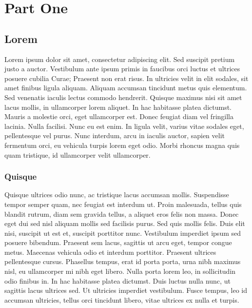 \part{Part One}

\chapter{Lorem}

\setcounter{page}{1}

Lorem ipsum dolor sit amet, consectetur adipiscing elit. Sed suscipit pretium justo a auctor. Vestibulum ante ipsum primis in faucibus orci luctus et ultrices posuere cubilia Curae; Praesent non erat risus. In ultricies velit in elit sodales, sit amet finibus ligula aliquam. Aliquam accumsan tincidunt metus quis elementum. Sed venenatis iaculis lectus commodo hendrerit. Quisque maximus nisi sit amet lacus mollis, in ullamcorper lorem aliquet. In hac habitasse platea dictumst. Mauris a molestie orci, eget ullamcorper est. Donec feugiat diam vel fringilla lacinia. Nulla facilisi. Nunc eu est enim. In ligula velit, varius vitae sodales eget, pellentesque vel purus. Nunc interdum, arcu in iaculis auctor, sapien velit fermentum orci, eu vehicula turpis lorem eget odio. Morbi rhoncus magna quis quam tristique, id ullamcorper velit ullamcorper.

\section{Quisque}

Quisque ultrices odio nunc, ac tristique lacus accumsan mollis. Suspendisse tempor semper quam, nec feugiat est interdum ut. Proin malesuada, tellus quis blandit rutrum, diam sem gravida tellus, a aliquet eros felis non massa. Donec eget dui sed nisl aliquam mollis sed facilisis purus. Sed quis mollis felis. Duis elit nisi, suscipit ut est et, suscipit porttitor nunc. Vestibulum imperdiet ipsum sed posuere bibendum. Praesent sem lacus, sagittis ut arcu eget, tempor congue metus. Maecenas vehicula odio et interdum porttitor. Praesent ultrices pellentesque cursus. Phasellus tempus, erat id porta porta, urna nibh maximus nisl, eu ullamcorper mi nibh eget libero. Nulla porta lorem leo, in sollicitudin odio finibus in. In hac habitasse platea dictumst. Duis luctus nulla nunc, ut sagittis lacus ultrices sed. Ut ultricies imperdiet vestibulum. Fusce tempus, leo id accumsan ultricies, tellus orci tincidunt libero, vitae ultrices ex nulla et turpis.

